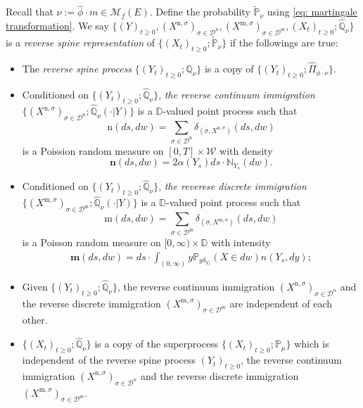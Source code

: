 \documentclass[12pt,a4paper]{amsart}
\numberwithin{equation}{section}
\theoremstyle{plain}
\theoremstyle{definition}
\theoremstyle{remark}
\begin{document}
    Recall that $\nu := \hat \phi \cdot m \in \mathcal M_f(E)$. Define the probability $\widetilde {\mathbb P}_\nu$ using \eqref{eq: martingale transformation}.
    We say $\{(Y)_{t\geq 0}, (X^{\mathrm n, \sigma})_{\sigma\in \mathcal D^\mathrm n}, (X^{\mathrm m, \sigma})_{\sigma \in \mathcal D^\mathrm m}, (X_t)_{t\geq 0}; \widehat {\mathbb Q}_{\nu}\}$ is a \emph{reverse spine representation} of $\{(X_t)_{t\geq 0}; \widetilde {\mathbb P}_\nu\}$ if the followings are true:
\begin{itemize}
\item
    The \emph{reverse spine process} $\{(Y_t)_{t\geq 0}; \widehat {\mathbb Q}_\nu\}$ is a copy of $\{(Y_t)_{t\geq 0}; \widehat \Pi_{\phi\cdot\nu}\}$.
\item
    Conditioned on $\{(Y_t)_{t\geq 0}; \widehat{\mathbb Q}_\nu\}$, \emph{the reverse continuum immigration} $\{ (X^{\mathrm n,\sigma})_{\sigma \in \mathcal D^\mathrm n}; \widehat{\mathbb Q}_\nu(\cdot |Y)\}$ is a $\mathbb D$-valued point process such that
\[
    \mathrm n(ds,dw)
    = \sum_{\sigma\in \mathcal D^{\mathrm n}} \delta_{(\sigma, X^{\mathrm n,\sigma})}(ds,dw)
\]
	is a Poission random measure on $[0,T]\times \mathcal W$ with density
\[
	\mathbf n(ds,dw)= 2\alpha(Y_s) ds \cdot \mathbb N_{Y_s}(dw).
\]
\item
    Conditioned on $\{(Y_t)_{t\geq 0}; \widehat{\mathbb Q}_\nu\}$, \emph{the reverese discrete immigration} $\{(X^{\mathrm m,\sigma})_{\sigma\in \mathcal D^{\mathrm m}}; \widehat{\mathbb Q}_\nu(\cdot |Y)\}$ is a $\mathbb D$-valued point process such that
\[
    \mathrm m(ds,dw)
    = \sum_{\sigma\in \mathcal D^{\mathrm m}} \delta_{(\sigma, X^{\mathrm m,\sigma})}(ds,dw)
\]
	is a Poisson random measure on $[0,\infty ) \times \mathbb D$ with intensity
\begin{align}\label{eq:meanMeasImmigr}
	\mathbf m(ds,dw)= ds \cdot \int_{(0,\infty)} y \mathbb P_{y\delta_{Y_s}}(X\in dw) n(Y_s,dy);
\end{align}
\item
	Given $\{(Y_t)_{t\geq 0}; \widehat{\mathbb Q}_\nu\}$, the reverse continuum immigration $(X^{\mathrm n,\sigma})_{\sigma \in \mathcal D^n}$ and the reverse discrete immigration $(X^{\mathrm m,\sigma})_{\sigma\in \mathcal D^{\mathrm m}}$ are independent of each other.
\item
	$\{(X_t)_{t\geq 0}; \widehat {\mathbb Q}_\nu\}$ is a copy of the superprocess $\{(X_t)_{t\geq 0}; \mathbb P_\mu\}$ which is independent of the reverse spine process $(Y_t)_{t\geq 0}$, the reverse continuum immigration $(X^{\mathrm n,\sigma})_{\sigma \in \mathcal D^n}$ and the reverse discrete immigration $(X^{\mathrm m,\sigma})_{\sigma\in \mathcal D^{\mathrm m}}$.
\end{itemize}
\end{document}

